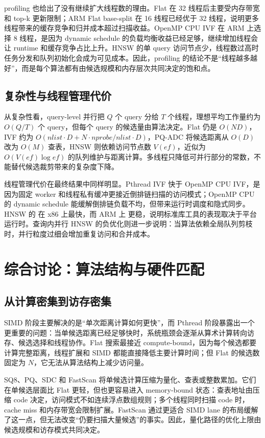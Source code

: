 \documentclass[11pt,a4paper]{article}
\newcommand{\code}[1]{\texttt{\detokenize{#1}}}
\begin{document}
profiling 也给出了没有继续扩大线程数的理由。Flat 在 32 线程后主要受内存带宽和 top-k 更新限制；ARM Flat base-split 在 16 线程已经优于 32 线程，说明更多线程带来的缓存竞争和归并成本超过扫描收益。OpenMP CPU IVF 在 ARM 上选择 8 线程，是因为 dynamic schedule 的负载均衡收益已经足够，继续增加线程会让 runtime 和缓存竞争占比上升。HNSW 的单 query 访问节点少，线程数过高时任务分发和队列初始化会成为可见成本。因此，profiling 的结论不是“线程越多越好”，而是每个算法都有由候选规模和内存层次共同决定的饱和点。

\subsection{复杂性与线程管理代价}

从复杂性看，query-level 并行把 $Q$ 个 query 分给 $T$ 个线程，理想平均工作量约为 $O(Q/T)$ 个 query，但每个 query 的候选量由算法决定。Flat 仍是 $O(ND)$，IVF 约为 $O(nlist\cdot D + N\cdot nprobe/nlist\cdot D)$，PQ-ADC 将候选距离从 $O(D)$ 改为 $O(M)$ 查表，HNSW 则依赖访问节点数 $V(ef)$，近似为 $O(V(ef)\log ef)$ 的队列维护与距离计算。多线程只降低可并行部分的常数，不能替代候选裁剪带来的复杂度下降。

线程管理代价在最终结果中同样明显。Pthread IVF 快于 OpenMP CPU IVF，是因为固定 worker 和线程私有缓冲更接近倒排链扫描的访问模式；OpenMP CPU 的 dynamic schedule 能缓解倒排链负载不均，但带来运行时调度和隐式同步。HNSW 的 \code{std::async} 在 x86 上最快，而 ARM 上 \code{std::thread} 更稳，说明标准库工具的表现取决于平台运行时。查询内并行 HNSW 的负优化则进一步说明：当算法依赖全局队列剪枝时，并行粒度过细会增加重复访问和合并成本。

\section{综合讨论：算法结构与硬件匹配}
\label{sec:discussion}

\subsection{从计算密集到访存密集}

SIMD 阶段主要解决的是“单次距离计算如何更快”，而 Pthread 阶段暴露出一个更重要的问题：当单候选距离已经足够快时，系统瓶颈会逐渐从算术计算转向访存、候选选择和线程协作。Flat 搜索最接近 compute-bound，因为每个候选都要计算完整距离，线程扩展和 SIMD 都能直接降低主要计算时间；但 Flat 的候选数固定为 $N$，它无法从算法结构上减少访问量。

SQ8、PQ、SDC 和 FastScan 将单候选计算压缩为量化、查表或整数累加。它们在单候选层面比 Flat 更轻，但也更容易进入 memory-bound 状态：查表地址由压缩 code 决定，访问模式不如连续浮点数组规则；多个线程同时扫描 code 时，cache miss 和内存带宽会限制扩展。FastScan 通过更适合 SIMD lane 的布局缓解了这一点，但无法改变“仍要扫描大量候选”的事实。因此，量化路径的优化上限由候选规模和访存模式共同决定。
\end{document}
